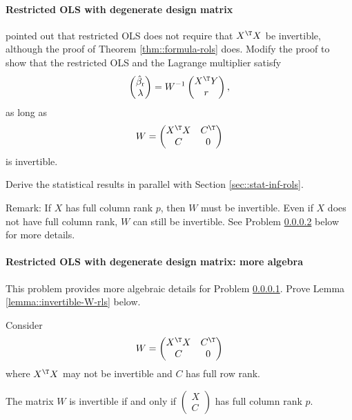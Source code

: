 \paragraph{Restricted OLS with degenerate design matrix}
\label{para::rols-degenerate-greene}


\citet{greene} pointed out that restricted OLS does not require that $X^{\T} X$ be invertible, although the proof of Theorem \ref{thm::formula-rols} does. Modify the proof to show that the restricted OLS and the Lagrange multiplier satisfy 
\begin{equation}\label{eq::r-ols-degenerate}
\begin{pmatrix}
\hat{\beta}_\textup{r}  \\
\lambda 
\end{pmatrix}
= 
W^{-1}
\begin{pmatrix}
X^{\T} Y \\
r
\end{pmatrix},
\end{equation}
as long as 
$$
W = 
\begin{pmatrix}
X^{\T} X &  C^{\T} \\
C & 0 
\end{pmatrix}
$$
is invertible. 



Derive the statistical results in parallel with Section \ref{sec::stat-inf-rols}. 


Remark:
If $X$ has full column rank $p$, then $W$ must be invertible. Even if $X$ does not have full column rank, $W$ can still be invertible. See Problem \ref{para::rols-degenerate-condition} below for more details. 

 



\paragraph{Restricted OLS with degenerate design matrix: more algebra}
\label{para::rols-degenerate-condition}


This problem provides more algebraic details for Problem \ref{para::rols-degenerate-greene}. Prove Lemma \ref{lemma::invertible-W-rls} below.  


\begin{lemma}
\label{lemma::invertible-W-rls}
Consider 
$$
W = 
\begin{pmatrix}
X^{\T} X &  C^{\T} \\
C & 0 
\end{pmatrix}
$$
where $X^{\T} X$ may not be invertible and $C$ has full row rank. 

The matrix $W$ is invertible if and only if
$
\begin{pmatrix}
X\\
C
\end{pmatrix}
$
has full column rank $p$. 
\end{lemma}



